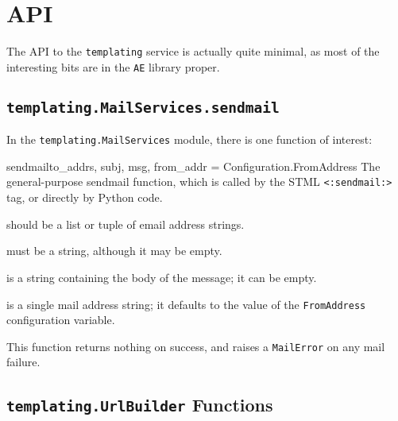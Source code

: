 \documentclass{manual}
\begin{document}
\section{API}
The API to the \texttt{templating} service is actually quite minimal,
as most of the interesting bits are in the \texttt{AE} library proper.

\subsection{\texttt{templating.MailServices.sendmail}}

In the \texttt{templating.MailServices} module, there is one function
of interest:

\begin{funcdesc}{sendmail}{to_addrs, subj, msg, from_addr =
Configuration.FromAddress} 
The general-purpose sendmail function, which is called
    by the STML \texttt{<:sendmail:>} tag, or directly by Python code.

\begin{argdesc}
\item[to\_addrs] should be a list or tuple of email address
    strings. 
\item[subj] must be a string, although it may be empty.
\item[msg] is a string containing the body of the message; it can
    be empty. 
\item[from\_addr] is a single mail address string; it 
    defaults to the value of the \texttt{FromAddress} configuration variable.
\end{argdesc}
This function returns nothing on success, and raises a
\texttt{MailError} on any mail failure. 

\end{funcdesc}





\subsection{\texttt{templating.UrlBuilder} Functions}
\end{document}
